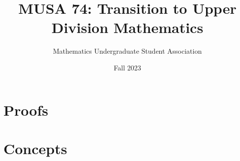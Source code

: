 \documentclass[openany]{book}
\title{MUSA 74: Transition to Upper Division Mathematics}
\author{Mathematics Undergraduate Student Association}
\date{Fall 2023}
\begin{document}


\part{Proofs}





\part{Concepts}




\nirprintbib
\nirprintindex
\end{document}
